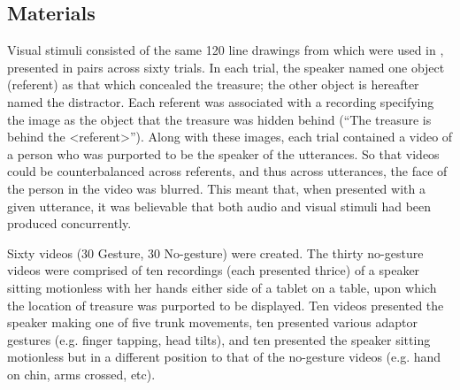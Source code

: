 \documentclass[a4paper,man,natbib]{apa6}
\begin{document}

\subsection{Materials}
Visual stimuli consisted of the same 120 line drawings from \citet{Snodgrass1980} which were used in \citet{Loy2017}, presented in pairs across sixty trials. 
In each trial, the speaker named one object (referent) as that which concealed the treasure; the other object is hereafter named the distractor.
Each referent was associated with a recording specifying the image as the object that the treasure was hidden behind (``The treasure is behind the <referent>'').
Along with these images, each trial contained a video of a person who was purported to be the speaker of the utterances. 
So that videos could be counterbalanced across referents, and thus across utterances, the face of the person in the video was blurred. 
This meant that, when presented with a given utterance, it was believable that both audio and visual stimuli had been produced concurrently. 

Sixty videos (30 Gesture, 30 No-gesture) were created. 
The thirty no-gesture videos were comprised of ten recordings (each presented thrice) of a speaker sitting motionless with her hands either side of a tablet on a table, upon which the location of treasure was purported to be displayed.
Ten videos presented the speaker making one of five trunk movements, ten presented various adaptor gestures (e.g. finger tapping, head tilts), and ten presented the speaker sitting motionless but in a different position to that of the no-gesture videos (e.g. hand on chin, arms crossed, etc).
\end{document}
